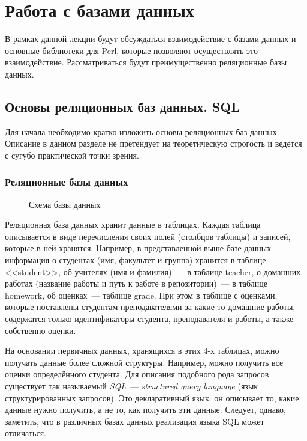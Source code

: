 \setcounter{chapter}{6}
\chapter{Работа с базами данных}


В рамках данной лекции будут обсуждаться взаимодействие с базами данных и основные библиотеки для Perl, которые позволяют осуществлять это взаимодействие.
Рассматриваться будут преимущественно реляционные базы данных.



\section{Основы реляционных баз данных. SQL}
Для начала необходимо кратко изложить основы реляционных баз данных.
Описание в данном разделе не претендует на теоретическую строгость и ведётся с сугубо практической точки зрения.

\subsection{Реляционные базы данных}
\begin{figure}[H] \centering
  
  \caption{Схема базы данных}
\end{figure}

Реляционная база данных хранит данные в таблицах. Каждая таблица описывается в виде перечисления своих полей (столбцов таблицы) и записей, которые в ней хранятся.
Например, в представленной выше базе данных
информация о студентах (имя, факультет и группа) хранится в таблице <<student>>,
об учителях (имя и фамилия)~--- в таблице teacher,
о домашних работах (название работы и путь к работе в репозитории)~---
в таблице homework,
об оценках~--- таблице grade.
При этом в таблице с оценками, которые поставлены студентам преподавателями за какие-то домашние работы, содержатся только идентификаторы студента, преподавателя и работы, а также собственно оценки.

На основании первичных данных, хранящихся в этих 4-х таблицах, можно
получать данные более сложной структуры.
Например, можно получить все оценки определённого студента.
Для описания подобного рода запросов существует так называемый \emph{SQL}~---
\emph{structured query language} (язык структурированных запросов).
Это декларативный язык: он описывает то, какие данные нужно получить, а не то,
как получить эти данные.
Следует, однако, заметить, что в различных базах данных реализация языка SQL может отличаться.


